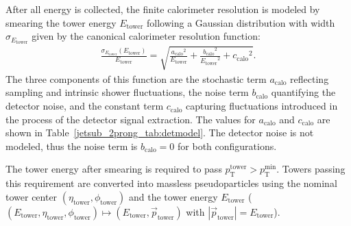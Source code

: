 \documentclass[11pt,letterpaper]{article}
\begin{document}
After all energy is collected, the finite calorimeter resolution is modeled by smearing the tower energy \ensuremath{E_{\text{tower}}}{} following a Gaussian distribution with width 
$\sigma_{\ensuremath{E_{\text{tower}}}}$ given by the canonical calorimeter resolution function:
\begin{align}
  \frac{\sigma_{\ensuremath{E_{\text{tower}}}}(\ensuremath{E_{\text{tower}}})}{\ensuremath{E_{\text{tower}}}} = \sqrt{\frac{\ensuremath{a_{\text{calo}}}^{2}}{\ensuremath{E_{\text{tower}}}} + \frac{\ensuremath{b_{\text{calo}}}^2}{\ensuremath{E_{\text{tower}}}^{2}} + \ensuremath{c_{\text{calo}}}^{2}}.
  \label{jetsub_2prong_eq:caloreso}
\end{align}
The three components of this function are the stochastic term \ensuremath{a_{\text{calo}}}{} reflecting sampling and intrinsic shower fluctuations, the noise term \ensuremath{b_{\text{calo}}}{} quantifying the detector noise, 
and the constant term \ensuremath{c_{\text{calo}}}{} capturing fluctuations introduced in the process of the detector signal extraction.  
The values for \ensuremath{a_{\text{calo}}}{} and \ensuremath{c_{\text{calo}}}{} are shown in Table~\ref{jetsub_2prong_tab:detmodel}. 
The detector noise is not modeled, thus the noise term is $\ensuremath{b_{\text{calo}}}=0$ for both configurations.

The tower energy after smearing is required to pass $\ensuremath{p_{\text{T}}^{\text{tower}}} > \ensuremath{p_{\text{T}}^{\text{min}}}$. 
Towers passing this requirement are converted into massless pseudoparticles using the 
nominal tower center $(\ensuremath{\eta_{\text{tower}}},\ensuremath{\phi_{\text{tower}}})$ and the tower energy \ensuremath{E_{\text{tower}}}{} ($(\ensuremath{E_{\text{tower}}},\ensuremath{\eta_{\text{tower}}},\ensuremath{\phi_{\text{tower}}}) \mapsto (\ensuremath{E_{\text{tower}}},\vec{p}_{\text{tower}})$ with $|\vec{p}_{\text{tower}}| = \ensuremath{E_{\text{tower}}}$).
\end{document}
